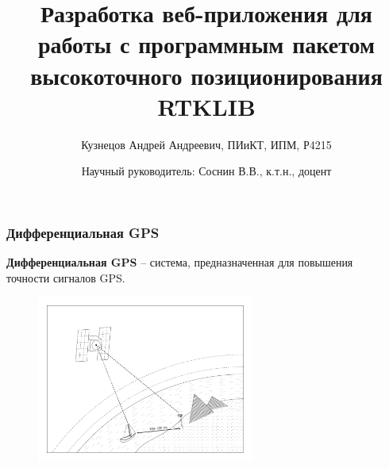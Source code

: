 \documentclass[xetex,с,aspectratio=169]{beamer}
\title{Разработка веб-приложения для работы с программным пакетом высокоточного позиционирования RTKLIB}
\author[Кузнецов А.А., P3410]{Кузнецов Андрей Андреевич, ПИиКТ, ИПМ, Р4215}
\date[]{Научный руководитель: Соснин В.В., к.т.н., доцент}
\begin{document}
%
%
{
  \begin{frame}
    \titlepage
  \end{frame}
}


%
%
\begin{frame}
  \frametitle{Дифференциальная GPS}

  \begin{center}
    \textbf{Дифференциальная GPS} -- система, предназначенная для повышения\\точности сигналов GPS.
  \end{center}

  \vskip -0.25cm

  \begin{figure}[h]
    \centering
    \includegraphics[height=5.5cm]{../img/tikz/dgps-one/pic}
  \end{figure}
\end{frame}
\end{document}
